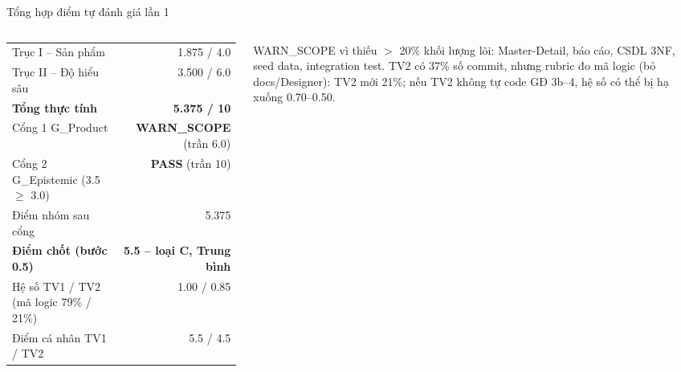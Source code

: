 \begin{frame}{Tổng hợp điểm tự đánh giá lần 1}
\begin{columns}[c]
\centering
{}
\scriptsize
\begin{tabular}{@{}lr@{}}
\toprule
Trục I -- Sản phẩm & 1.875 / 4.0 \\
Trục II -- Độ hiểu sâu & 3.500 / 6.0 \\
\textbf{Tổng thực tính} & \textbf{5.375 / 10} \\
\midrule
Cổng 1 G\_Product & \textcolor{warn}{\textbf{WARN\_SCOPE}} (trần 6.0) \\
Cổng 2 G\_Epistemic (3.5 $\ge$ 3.0) & \textcolor{okc}{\textbf{PASS}} (trần 10) \\
Điểm nhóm sau cổng & 5.375 \\
\textbf{Điểm chốt (bước 0.5)} & \textbf{5.5 -- loại C, Trung bình} \\
\midrule
Hệ số TV1 / TV2 (mã logic 79\% / 21\%) & 1.00 / \textcolor{warn}{0.85} \\
Điểm cá nhân TV1 / TV2 & 5.5 / 4.5 \\
\bottomrule
\end{tabular}

\vspace{2mm}
{\tiny WARN\_SCOPE vì thiếu $>$ 20\% khối lượng lõi: Master-Detail, báo cáo, CSDL 3NF, seed data, integration test. TV2 có 37\% số commit, nhưng rubric đo  mã logic (bỏ docs/Designer): TV2 mới 21\%; nếu TV2 không tự code GĐ 3b--4, hệ số có thể bị hạ xuống 0.70--0.50.\par}
\end{columns}
\end{frame}

